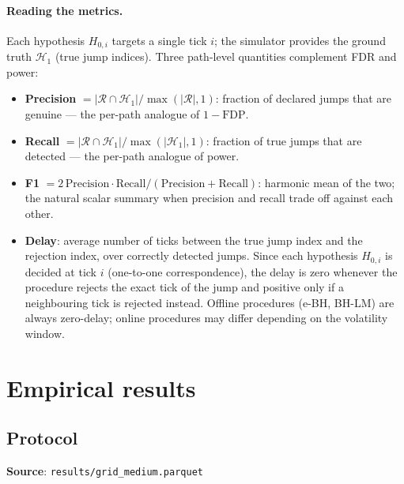 \documentclass[11pt,a4paper]{article}
\theoremstyle{plain}
\theoremstyle{definition}
\theoremstyle{remark}
\begin{document}
\paragraph{Reading the metrics.}
Each hypothesis $H_{0,i}$ targets a single tick $i$; the simulator provides
the ground truth $\mathcal{H}_1$ (true jump indices). Three path-level
quantities complement FDR and power:
\begin{itemize}[noitemsep]
  \item \textbf{Precision} $= |\mathcal{R}\cap\mathcal{H}_1|/\max(|\mathcal{R}|,1)$:
    fraction of declared jumps that are genuine --- the per-path analogue of
    $1 - \mathrm{FDP}$.
  \item \textbf{Recall} $= |\mathcal{R}\cap\mathcal{H}_1|/\max(|\mathcal{H}_1|,1)$:
    fraction of true jumps that are detected --- the per-path analogue of
    power.
  \item \textbf{F1} $= 2\,\mathrm{Precision}\cdot\mathrm{Recall}/(\mathrm{Precision}+\mathrm{Recall})$:
    harmonic mean of the two; the natural scalar summary when precision and
    recall trade off against each other.
  \item \textbf{Delay}: average number of ticks between the true jump index
    and the rejection index, over correctly detected jumps. Since each
    hypothesis $H_{0,i}$ is decided at tick $i$ (one-to-one correspondence),
    the delay is zero whenever the procedure rejects the exact tick of the
    jump and positive only if a neighbouring tick is rejected instead.
    Offline procedures (e-BH, BH-LM) are always zero-delay; online procedures
    may differ depending on the volatility window.
\end{itemize}

\section{Empirical results}
\label{sec:results}

\subsection{Protocol}

\textbf{Source}: \texttt{results/grid\_medium.parquet} 
\end{document}
